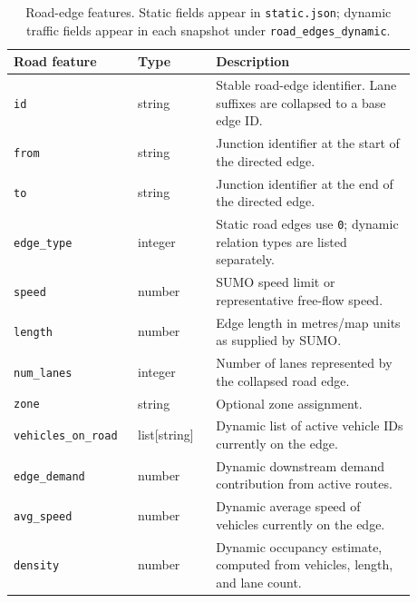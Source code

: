 \begin{table}[!htbp]
\centering
\scriptsize
\begin{tabular}{p{0.24\linewidth}p{0.18\linewidth}p{0.46\linewidth}}
\toprule
\textbf{Road feature} & \textbf{Type} & \textbf{Description} \\
\midrule
\texttt{id} & string & Stable road-edge identifier. Lane suffixes are collapsed to a base edge ID. \\
\texttt{from} & string & Junction identifier at the start of the directed edge. \\
\texttt{to} & string & Junction identifier at the end of the directed edge. \\
\texttt{edge\_type} & integer & Static road edges use \texttt{0}; dynamic relation types are listed separately. \\
\texttt{speed} & number & SUMO speed limit or representative free-flow speed. \\
\texttt{length} & number & Edge length in metres/map units as supplied by SUMO. \\
\texttt{num\_lanes} & integer & Number of lanes represented by the collapsed road edge. \\
\texttt{zone} & string & Optional zone assignment. \\
\texttt{vehicles\_on\_road} & list[string] & Dynamic list of active vehicle IDs currently on the edge. \\
\texttt{edge\_demand} & number & Dynamic downstream demand contribution from active routes. \\
\texttt{avg\_speed} & number & Dynamic average speed of vehicles currently on the edge. \\
\texttt{density} & number & Dynamic occupancy estimate, computed from vehicles, length, and lane count. \\
\bottomrule
\end{tabular}
\caption{Road-edge features. Static fields appear in \texttt{static.json}; dynamic traffic fields appear in each snapshot under \texttt{road\_edges\_dynamic}.}
\label{tab:road_features}
\end{table}


